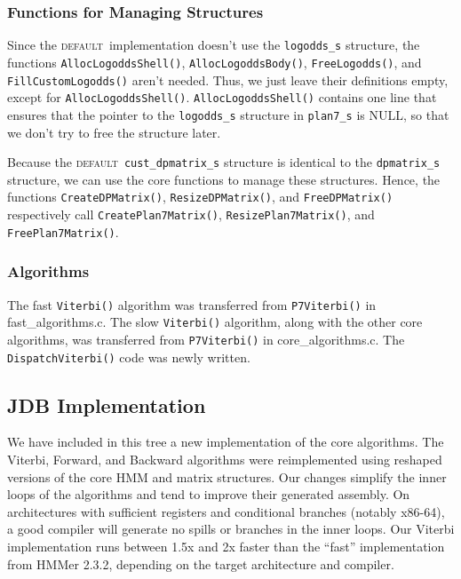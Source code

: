 \documentclass[letterpaper,10pt]{article}
\newcommand{\func}[1]{\texttt{#1()}}
\newcommand{\struct}[1]{\texttt{#1}}
\newcommand{\impl}[1]{\small{\textsc{\textsf{#1}}}}
\newcommand{\deft}{\impl{default}}
\begin{document}
\subsubsection*{Functions for Managing Structures}

Since the \deft\ implementation doesn't use the \struct{logodds\_s}
structure, the functions \func{AllocLogoddsShell}, \linebreak
\func{AllocLogoddsBody}, \func{FreeLogodds}, and
\func{FillCustomLogodds} aren't needed.  Thus, we just leave their
definitions empty, except for \func{AllocLogoddsShell}.
\func{AllocLogoddsShell} contains one line that ensures that the
pointer to the \struct{logodds\_s} structure in \struct{plan7\_s} is
NULL, so that we don't try to free the structure later.

Because the \deft\ \struct{cust\_dpmatrix\_s} structure is identical
to the \struct{dpmatrix\_s} structure, we can use the core functions
to manage these structures.  Hence, the functions
\func{CreateDPMatrix}, \func{ResizeDPMatrix}, and \func{FreeDPMatrix}
respectively call \func{CreatePlan7Matrix}, \func{ResizePlan7Matrix},
and \func{FreePlan7Matrix}.

\subsubsection*{Algorithms}

The fast \func{Viterbi} algorithm was transferred from
\func{P7Viterbi} in fast\_algorithms.c.  The slow \func{Viterbi}
algorithm, along with the other core algorithms, was transferred from
\func{P7Viterbi} in core\_algorithms.c.  The \func{DispatchViterbi}
code was newly written.
 
\subsection*{JDB Implementation}

We have included in this tree a new implementation of the core
algorithms.  The Viterbi, Forward, and Backward algorithms were
reimplemented using reshaped versions of the core HMM and matrix
structures.  Our changes simplify the inner loops of the algorithms
and tend to improve their generated assembly.  On architectures with
sufficient registers and conditional branches (notably x86-64), a good
compiler will generate no spills or branches in the inner loops.
Our Viterbi implementation runs between 1.5x and 2x faster than the
``fast'' implementation from HMMer 2.3.2, depending on the target
architecture and compiler.
\end{document}
